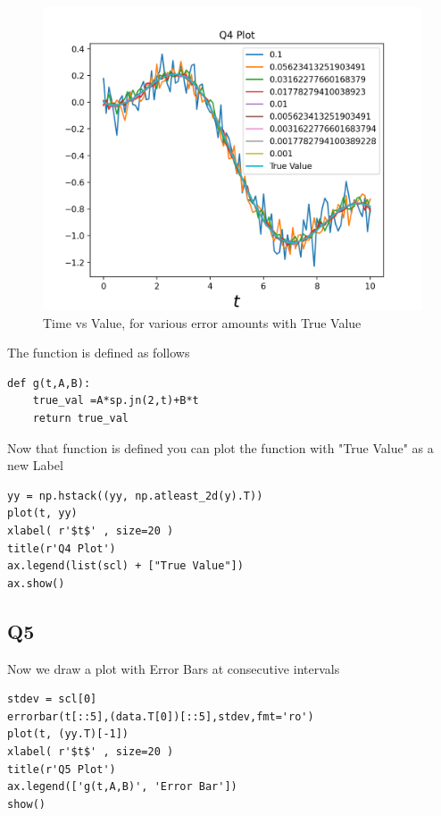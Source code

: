 \documentclass[12pt, a4paper]{report}
\begin{document}
 \begin{figure}[!tbh]
   	\centering
   	\includegraphics[scale=0.5]{Qn4.png}
	\caption{Time vs Value, for various error amounts with True Value}
   	\label{fig:trueNoMatrix}
 \end{figure}
The function is defined as follows
\begin{Verbatim}
def g(t,A,B):
    true_val =A*sp.jn(2,t)+B*t 
    return true_val
\end{Verbatim}
Now that function is defined you can plot the function with "True Value"  as a new Label
 \begin{Verbatim}
yy = np.hstack((yy, np.atleast_2d(y).T))
plot(t, yy)
xlabel( r'$t$' , size=20 )
title(r'Q4 Plot')
ax.legend(list(scl) + ["True Value"])
ax.show() 
\end{Verbatim}
   
  
 \subsection{Q5}
Now we draw a plot with Error Bars at consecutive intervals
 \begin{Verbatim}
stdev = scl[0]
errorbar(t[::5],(data.T[0])[::5],stdev,fmt='ro')
plot(t, (yy.T)[-1])
xlabel( r'$t$' , size=20 )
title(r'Q5 Plot')
ax.legend(['g(t,A,B)', 'Error Bar'])
show()
\end{Verbatim}
\end{document}

